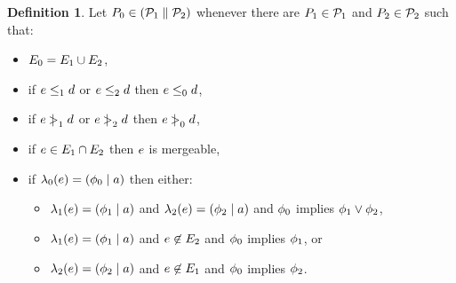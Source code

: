 \documentclass[conference]{IEEEtran}
\theoremstyle{plain}
\theoremstyle{definition}
\newtheorem{definition}[theorem]{Definition}
\begin{document}
\begin{definition}
Let $P_0 \in (\mathcal{P}_1 \parallel \mathcal{P}_2)$
whenever there are $P_1 \in \mathcal{P}_1$ and $P_2 \in \mathcal{P}_2$ such that:
\begin{itemize}
\item $E_0 = E_1 \cup E_2$,
\item if $e \le_1 d$ or $e \le_2 d$ then $e \le_0 d$,
\item if $e \mathrel{\,\mid\!\!\!>}_1 d$ or $e \mathrel{\,\mid\!\!\!>}_2 d$ then $e \mathrel{\,\mid\!\!\!>}_0 d$,
\item if $e\in E_1\cap E_2$ then $e$ is mergeable,
\item if $\lambda_0(e) = (\phi_0 \mid a)$ then either:
  \begin{itemize}
  \item $\lambda_1(e) = (\phi_1 \mid a)$ and $\lambda_2(e) = (\phi_2 \mid a)$
    and $\phi_0$ implies $\phi_1 \lor \phi_2$,
  \item $\lambda_1(e) = (\phi_1 \mid a)$ and $e \not\in E_2$
    and $\phi_0$ implies $\phi_1$, or
  \item $\lambda_2(e) = (\phi_2 \mid a)$ and $e \not\in E_1$
    and $\phi_0$ implies $\phi_2$.
  \end{itemize}
\end{itemize}
\end{definition}
\end{document}
